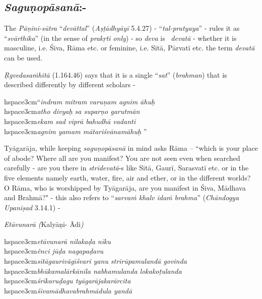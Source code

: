 \vspace{-.3cm}

\subsection*{\textit{Saguṇopāsanā}:-}

The \textit{Pāṇini-sūtra} “\textit{devāttal}” (\textit{Aṣṭādhyāyī} 5.4.27) - “\textit{tal-pratyaya}” - rules it as “\textit{svārthika}” (in the sense of \textit{prakṛti only}) - so \textit{deva} is  \textit{devatā} - whether it is masculine, i.e. Śiva, Rāma etc. or feminine, i.e. Sītā\textit{,} Pārvatī etc. the term \textit{devatā} can be used. 

\textit{Ṛgvedasaṁhitā} (1.164.46) says that it is a single “\textit{sat}” (\textit{brahman}) that is described differently by different scholars -

\begin{myquote}
hspace{3cm}“\textit{indram mitram varuṇam agnim āhuḥ}\\hspace{3cm}\textit{atho divyaḥ sa suparṇo garutmān} \\hspace{3cm}\textit{ekam sad viprā bahudhā vadanti}\\hspace{3cm}\textit{agnim yamam mātariśvānamāhuḥ} ”
\end{myquote}

Tyāgarāja, while keeping \textit{saguṇopāsanā} in mind asks Rāma – ``which is your place of abode? Where all are you manifest? You are not seen even when searched carefully - are you there in \textit{strīdevatā}-s like Sītā\textit{,} Gaurī\textit{,} Sarasvatī etc. or in the five elements namely earth, water, fire, air and ether, or in the different worlds? O Rāma, who is worshipped by Tyāgarāja, are you manifest in Śiva, Mādhava and Brahmā?" - this also refers to “\textit{sarvaṁ khalv idaṁ brahma}” (\textit{Chāndogya Upaniṣad} 3.14.1) - 

\textit{Etāvunarā (}Kalyāṇi- Ādi\textit{)}

\begin{myquote}
hspace{3cm}\textit{etāvunarā nilakaḍa nīku}\\hspace{3cm}\textit{ênci jūḍa nagapaḍavu}\\hspace{3cm}\textit{sītāgaurivāgīśvari yanu strīrūpamulandā govinda}\\hspace{3cm}\textit{bhūkamalārkānila nabhamulanda lokakoṭulanda}\\hspace{3cm}\textit{śrīkaruḍagu tyāgarājakarārcita}\\hspace{3cm}\textit{śivamādhavabrahmādula yandā}
\end{myquote}

